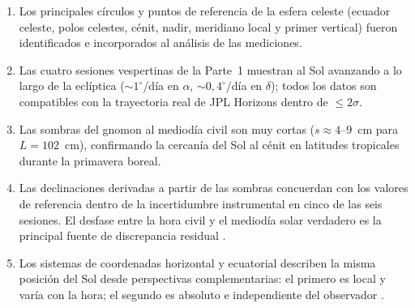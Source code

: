 \begin{enumerate}
  \item Los principales círculos y puntos de referencia de la esfera celeste
        (ecuador celeste, polos celestes, cénit, nadir, meridiano local y primer vertical)
        fueron identificados e incorporados al análisis de las mediciones.

  \item Las cuatro sesiones vespertinas de la Parte~1 muestran al Sol avanzando a lo
        largo de la eclíptica (${\sim}1^\circ$/día en $\alpha$,
        ${\sim}0{,}4^\circ$/día en $\delta$); todos los datos son compatibles con
        la trayectoria real de JPL Horizons \citep{Giorgini1996} dentro de
        $\leq 2\sigma$.

  \item Las sombras del gnomon al mediodía civil son muy cortas
        ($s \approx 4$--$9$~cm para $L = 102$~cm), confirmando la cercanía del Sol al
        cénit en latitudes tropicales durante la primavera boreal.

  \item Las declinaciones derivadas a partir de las sombras concuerdan con los valores
        de referencia dentro de la incertidumbre instrumental en cinco de las seis sesiones.
        El desfase entre la hora civil y el mediodía solar verdadero es la principal fuente
        de discrepancia residual \citep{Meeus1998}.

  \item Los sistemas de coordenadas horizontal y ecuatorial describen la misma posición
        del Sol desde perspectivas complementarias: el primero es local y varía con la hora;
        el segundo es absoluto e independiente del observador \citep{PortillaBarbosa2009,Karttunen2007}.
\end{enumerate}

